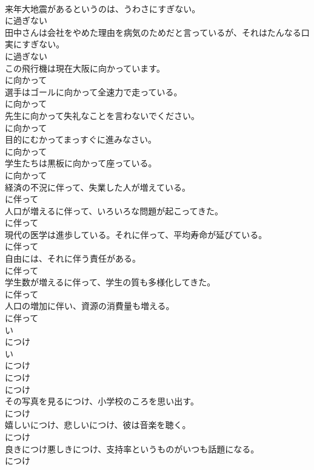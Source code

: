 \documentclass[8pt]{extreport}
\begin{document}
\begin{CJK}{UTF8}{min}
\\	来年大地震があるというのは、うわさにすぎない。	
\\	に過ぎない
\\	田中さんは会社をやめた理由を病気のためだと言っているが、それはたんなる口実にすぎない。	
\\	に過ぎない
\\	この飛行機は現在大阪に向かっています。	
\\	に向かって
\\	選手はゴールに向かって全速力で走っている。	
\\	に向かって
\\	先生に向かって失礼なことを言わないでください。	
\\	に向かって
\\	目的にむかってまっすぐに進みなさい。	
\\	に向かって
\\	学生たちは黒板に向かって座っている。	
\\	に向かって
\\	経済の不況に伴って、失業した人が増えている。	
\\	に伴って
\\	人口が増えるに伴って、いろいろな問題が起こってきた。	
\\	に伴って
\\	現代の医学は進歩している。それに伴って、平均寿命が延びている。	
\\	に伴って
\\	自由には、それに伴う責任がある。	
\\	に伴って
\\	学生数が増えるに伴って、学生の質も多様化してきた。	
\\	に伴って
\\	人口の増加に伴い、資源の消費量も増える。	
\\	に伴って
\\	い
\\	につけ 
\\	い
\\	につけ 
\\	につけ 
\\	につけ
\\	その写真を見るにつけ、小学校のころを思い出す。	
\\	につけ
\\	嬉しいにつけ、悲しいにつけ、彼は音楽を聴く。	
\\	につけ
\\	良きにつけ悪しきにつけ、支持率というものがいつも話題になる。	
\\	につけ

\end{CJK}
\end{document}
